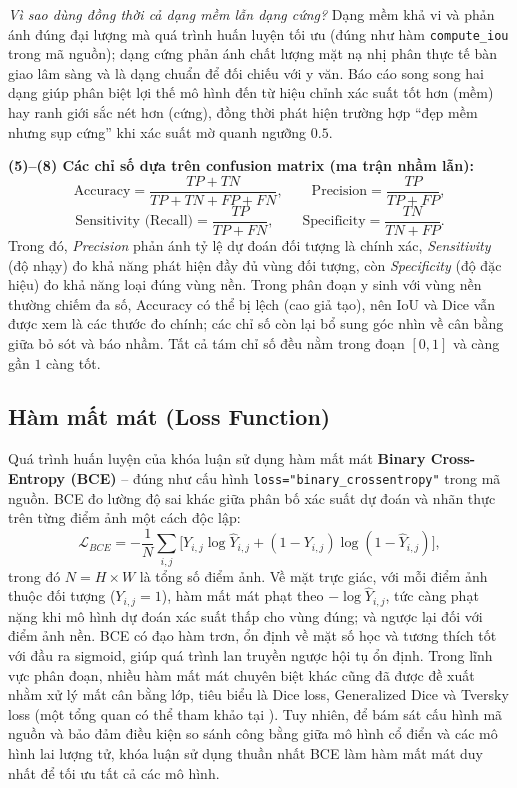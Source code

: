 \emph{Vì sao dùng đồng thời cả dạng mềm lẫn dạng cứng?} Dạng mềm khả vi và phản ánh đúng đại lượng mà quá trình huấn luyện tối ưu (đúng như hàm \texttt{compute\_iou} trong mã nguồn); dạng cứng phản ánh chất lượng mặt nạ nhị phân thực tế bàn giao lâm sàng và là dạng chuẩn để đối chiếu với y văn. Báo cáo song song hai dạng giúp phân biệt lợi thế mô hình đến từ hiệu chỉnh xác suất tốt hơn (mềm) hay ranh giới sắc nét hơn (cứng), đồng thời phát hiện trường hợp ``đẹp mềm nhưng sụp cứng'' khi xác suất mờ quanh ngưỡng $0.5$.

\noindent\textbf{(5)--(8) Các chỉ số dựa trên confusion matrix (ma trận nhầm lẫn):}
\begin{equation}
    \text{Accuracy} = \frac{TP + TN}{TP + TN + FP + FN},
    \qquad
    \text{Precision} = \frac{TP}{TP + FP},
\end{equation}
\begin{equation}
    \text{Sensitivity (Recall)} = \frac{TP}{TP + FN},
    \qquad
    \text{Specificity} = \frac{TN}{TN + FP}.
\end{equation}
Trong đó, \emph{Precision} phản ánh tỷ lệ dự đoán đối tượng là chính xác, \emph{Sensitivity} (độ nhạy) đo khả năng phát hiện đầy đủ vùng đối tượng, còn \emph{Specificity} (độ đặc hiệu) đo khả năng loại đúng vùng nền. Trong phân đoạn y sinh với vùng nền thường chiếm đa số, Accuracy có thể bị lệch (cao giả tạo), nên IoU và Dice vẫn được xem là các thước đo chính; các chỉ số còn lại bổ sung góc nhìn về cân bằng giữa bỏ sót và báo nhầm. Tất cả tám chỉ số đều nằm trong đoạn $[0,1]$ và càng gần $1$ càng tốt.

\subsection{Hàm mất mát (Loss Function)}
\label{subsec:loss}
Quá trình huấn luyện của khóa luận sử dụng hàm mất mát \textbf{Binary Cross-Entropy (BCE)} -- đúng như cấu hình \texttt{loss="binary\_crossentropy"} trong mã nguồn. BCE đo lường độ sai khác giữa phân bố xác suất dự đoán và nhãn thực trên từng điểm ảnh một cách độc lập:
\begin{equation}
    \mathcal{L}_{BCE} = - \frac{1}{N} \sum_{i,j} \Big[ Y_{i,j} \log \hat{Y}_{i,j} + (1-Y_{i,j}) \log (1-\hat{Y}_{i,j}) \Big],
\end{equation}
trong đó $N = H \times W$ là tổng số điểm ảnh. Về mặt trực giác, với mỗi điểm ảnh thuộc đối tượng ($Y_{i,j}=1$), hàm mất mát phạt theo $-\log \hat{Y}_{i,j}$, tức càng phạt nặng khi mô hình dự đoán xác suất thấp cho vùng đúng; và ngược lại đối với điểm ảnh nền. BCE có đạo hàm trơn, ổn định về mặt số học và tương thích tốt với đầu ra sigmoid, giúp quá trình lan truyền ngược hội tụ ổn định. Trong lĩnh vực phân đoạn, nhiều hàm mất mát chuyên biệt khác cũng đã được đề xuất nhằm xử lý mất cân bằng lớp, tiêu biểu là Dice loss, Generalized Dice \cite{sudre2017generalizeddice} và Tversky loss \cite{salehi2017tversky} (một tổng quan có thể tham khảo tại \cite{jadon2020losssurvey}). Tuy nhiên, để bám sát cấu hình mã nguồn và bảo đảm điều kiện so sánh công bằng giữa mô hình cổ điển và các mô hình lai lượng tử, khóa luận sử dụng thuần nhất BCE làm hàm mất mát duy nhất để tối ưu tất cả các mô hình.

